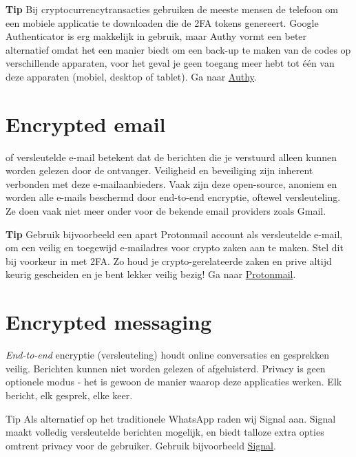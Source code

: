 \begin{tipbox}{\textbf{Tip}}
    Bij cryptocurrencytransacties gebruiken de meeste mensen de telefoon om een mobiele applicatie te downloaden die de 2FA tokens genereert. Google Authenticator is erg makkelijk in gebruik, maar Authy vormt een beter alternatief omdat het een manier biedt om een back-up te maken van de codes op verschillende apparaten, voor het geval je geen toegang meer hebt tot {\'e}{\'e}n van deze apparaten (mobiel, desktop of tablet).
    \tcblower
    Ga naar \href{https://authy.com/}{Authy}.
\end{tipbox}\medskip

\section{Encrypted email}
 of versleutelde e-mail betekent dat de berichten die je verstuurd alleen kunnen worden gelezen door de ontvanger. Veiligheid en beveiliging zijn inherent verbonden met deze e-mailaanbieders. Vaak zijn deze open-source, anoniem en worden alle e-mails beschermd door end-to-end encryptie, oftewel versleuteling. Ze doen vaak niet meer onder voor de bekende email providers zoals Gmail. \medskip 

\begin{tipbox}{\textbf{Tip}}
    Gebruik bijvoorbeeld een apart Protonmail account als versleutelde e-mail, om een veilig en toegewijd e-mailadres voor crypto zaken aan te maken. Stel dit bij voorkeur in met 2FA. Zo houd je crypto-gerelateerde zaken en prive altijd keurig gescheiden en je bent lekker veilig bezig!
    \tcblower
    Ga naar \href{https://protonmail.com/}{Protonmail}.
\end{tipbox}

\section{Encrypted messaging}
\emph{End-to-end} encryptie (versleuteling) houdt online conversaties en gesprekken veilig. Berichten kunnen niet worden gelezen of afgeluisterd. Privacy is geen optionele modus - het is gewoon de manier waarop deze applicaties werken. Elk bericht, elk gesprek, elke keer.\medskip

\begin{tipbox}{Tip}
    Als alternatief op het traditionele WhatsApp raden wij Signal aan. Signal maakt volledig versleutelde berichten mogelijk, en biedt talloze extra opties omtrent privacy voor de gebruiker.
    \tcblower
    Gebruik bijvoorbeeld \href{https://signal.org/}{Signal}.
\end{tipbox}\medskip

